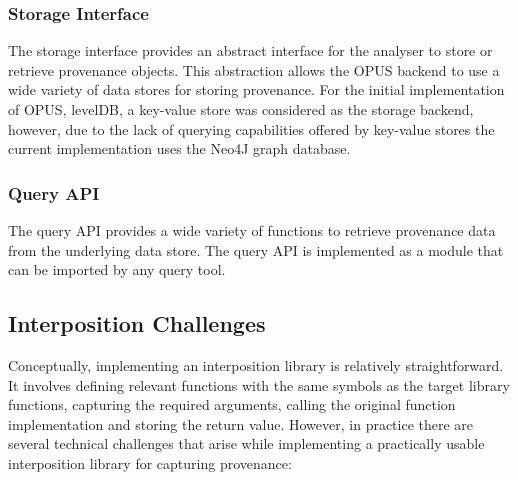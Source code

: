 \documentclass[withindex,glossary]{cam-thesis}
\begin{document}
\subsubsection{Storage Interface}
The storage interface provides an abstract interface for the analyser to store or retrieve provenance objects.
This abstraction allows the OPUS backend to use a wide variety of data stores for storing provenance.
For the initial implementation of OPUS, levelDB, a key-value store was considered as the storage backend, however, due to the lack of querying capabilities offered by key-value stores the current implementation uses the Neo4J graph database.

\subsubsection{Query API}
The query API provides a wide variety of functions to retrieve provenance data from the underlying data store.
The query API is implemented as a module that can be imported by any query tool.

\subsection{Interposition Challenges} 

Conceptually, implementing an interposition library is relatively straightforward.
It involves defining relevant functions with the same symbols as the target library functions, capturing the required arguments, calling the original function implementation and storing the return value.
However, in practice there are several technical challenges that arise while implementing a practically usable interposition library for capturing provenance:
\end{document}
